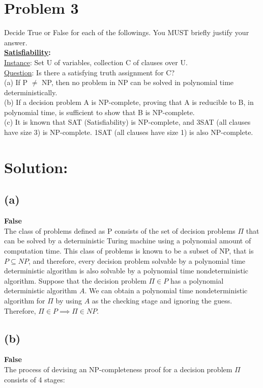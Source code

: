 \vspace{1cm}
\section*{Problem 3}
	Decide True or False for each of the followings. You MUST briefly justify your answer.\\
	
	\noindent
	\textbf{\underline{Satisfiability}:}\\
	\underline{Instance}: Set U of variables, collection C of clauses over U.\\
	\underline{Question}: Is there a satisfying truth assignment for C?\\
	
	\noindent
	(a) If P $\neq$ NP, then no problem in NP can be solved in polynomial time deterministically.\\
	(b) If a decision problem A is NP-complete, proving that A is reducible to B, in polynomial time, is sufficient to show that B is NP-complete.\\
	(c) It is known that SAT (Satisfiability) is NP-complete, and 3SAT (all clauses have size 3) is NP-complete. 1SAT (all clauses have size 1) is also NP-complete.
	
\section*{Solution:}
	\subsection*{(a)}
		\textbf{False}\\
		The class of problems defined as P consists of the set of decision problems $\Pi$ that can be solved by a deterministic Turing machine using a polynomial amount of computation time. 
		This class of problems is known to be a subset of NP, that is $P\subseteq NP$, and therefore, every decision problem solvable by a polynomial time deterministic algorithm is also solvable by a  polynomial time nondeterministic algorithm. 
		Suppose that the decision problem $\Pi \in P$ has a polynomial deterministic algorithm $A$. 
		We can obtain a polynomial time nondeterministic algorithm for $\Pi$ by using $A$ as the checking stage and ignoring the guess. Therefore, $\Pi \in P \implies \Pi \in NP$.
	
	\newpage
	\subsection*{(b)}
		\textbf{False}\\
		The process of devising an NP-completeness proof for a decision problem $\Pi$ consists of 4 stages:\\
		

